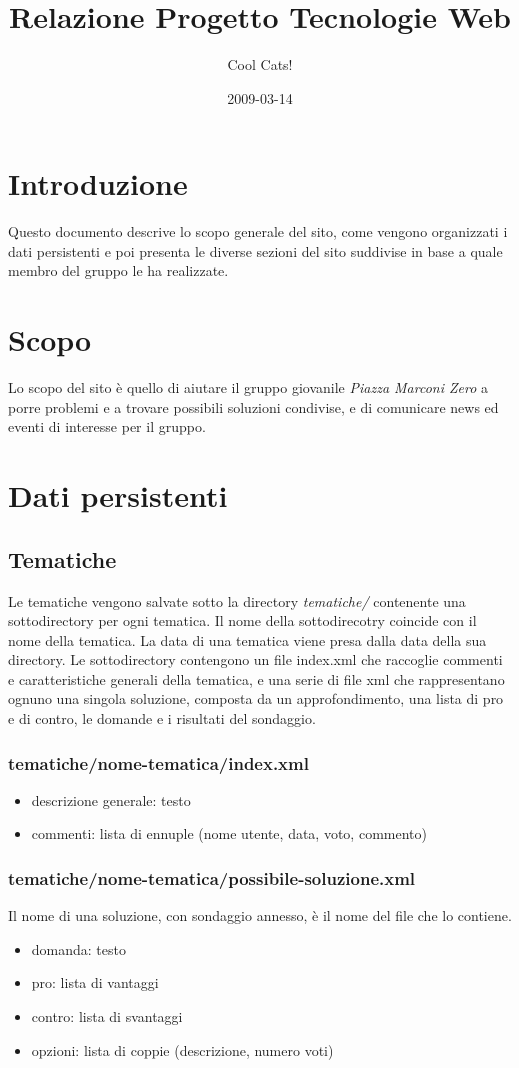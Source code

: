 \documentclass[a4paper,10pt]{article}
\author{Cool Cats!}
\title{Relazione Progetto Tecnologie Web}
\date{2009-03-14}
\begin{document}
\maketitle

\section{Introduzione}
Questo documento descrive lo scopo generale del sito, come vengono organizzati i dati persistenti e poi presenta le diverse sezioni del sito suddivise in base a quale membro del gruppo le ha realizzate.

\section{Scopo}
Lo scopo del sito \`e quello di aiutare il gruppo giovanile \textit{Piazza Marconi Zero} a porre problemi e a trovare possibili soluzioni condivise, e di comunicare news ed eventi di interesse per il gruppo.

\section{Dati persistenti}

\subsection{Tematiche}
Le tematiche vengono salvate sotto la directory \textit{tematiche/} contenente una sottodirectory per ogni tematica. Il nome della sottodirecotry coincide con il nome della tematica. La data di una tematica viene presa dalla data della sua  directory.
Le sottodirectory contengono un file index.xml che raccoglie commenti e caratteristiche generali della tematica, e una serie di file xml che rappresentano ognuno una singola soluzione, composta da un approfondimento, una lista di pro e di contro, le domande e i risultati del sondaggio.
\subsubsection{tematiche/nome-tematica/index.xml}
\begin{itemize}
 \item descrizione generale: testo
 \item commenti: lista di ennuple (nome utente, data, voto, commento)
\end{itemize}
\subsubsection{tematiche/nome-tematica/possibile-soluzione.xml}
Il nome di una soluzione, con sondaggio annesso, \`e il nome del file che lo contiene.
\begin{itemize}
 \item domanda: testo
 \item pro: lista di vantaggi
 \item contro: lista di svantaggi
 \item opzioni: lista di coppie (descrizione, numero voti)
\end{itemize}
\end{document}
